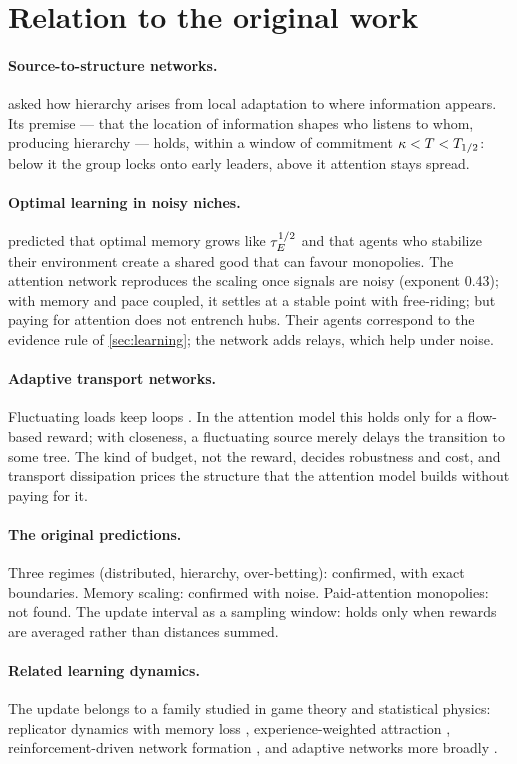 \section{Relation to the original work}\label{sec:origins}

\paragraph{Source-to-structure networks.} \citet{bromberg2020hierarchy} asked how hierarchy arises from local adaptation
to where information appears. Its premise --- that the location of information shapes who listens to whom, producing
hierarchy --- holds, within a window of commitment $\kappa<T<T_{1/2}$: below it the group locks onto early leaders, above it
attention stays spread.

\paragraph{Optimal learning in noisy niches.} \citet{lee2024constructing} predicted that optimal memory grows like
$\tau_E^{1/2}$ and that agents who stabilize their environment create a shared good that can favour monopolies. The
attention network reproduces the scaling once signals are noisy (exponent 0.43); with memory and pace coupled, it settles
at a stable point with free-riding; but paying for attention does not entrench hubs. Their agents correspond to the
evidence rule of \cref{sec:learning}; the network adds relays, which help under noise.

\paragraph{Adaptive transport networks.} Fluctuating loads keep loops
\citep{corson2010fluctuations,katifori2010damage}. In the attention model this holds only for a flow-based reward; with
closeness, a fluctuating source merely delays the transition to some tree. The kind of budget, not the reward, decides
robustness and cost, and transport dissipation prices the structure that the attention model builds without paying for it.

\paragraph{The original predictions.} Three regimes (distributed, hierarchy, over-betting): confirmed, with exact
boundaries. Memory scaling: confirmed with noise. Paid-attention monopolies: not found. The update interval as a sampling
window: holds only when rewards are averaged rather than distances summed.

\paragraph{Related learning dynamics.} The update belongs to a family studied in game theory and statistical physics:
replicator dynamics with memory loss \citep{sato2003coupled}, experience-weighted attraction
\citep{camerer1999experience}, reinforcement-driven network formation
\citep{skyrms2000dynamic,bala2000noncooperative}, and adaptive networks more broadly \citep{gross2008adaptive}.
